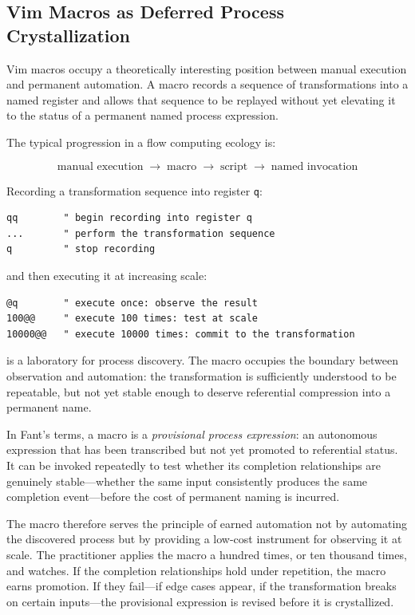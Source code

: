\documentclass[12pt, a4paper]{article}
\begin{document}
\subsection{Vim Macros as Deferred Process Crystallization}

Vim macros occupy a theoretically interesting position between
manual execution and permanent automation. A macro records a
sequence of transformations into a named register and allows that
sequence to be replayed without yet elevating it to the status of
a permanent named process expression.

The typical progression in a flow computing ecology is:

\[
\text{manual execution}
\;\to\;
\text{macro}
\;\to\;
\text{script}
\;\to\;
\text{named invocation}
\]

Recording a transformation sequence into register \texttt{q}:

\begin{lstlisting}
qq        " begin recording into register q
...       " perform the transformation sequence
q         " stop recording
\end{lstlisting}

and then executing it at increasing scale:

\begin{lstlisting}
@q        " execute once: observe the result
100@@     " execute 100 times: test at scale
10000@@   " execute 10000 times: commit to the transformation
\end{lstlisting}

is a laboratory for process discovery. The macro occupies the
boundary between observation and automation: the transformation
is sufficiently understood to be repeatable, but not yet stable
enough to deserve referential compression into a permanent name.

In Fant's terms, a macro is a \emph{provisional process
expression}: an autonomous expression that has been transcribed
but not yet promoted to referential status. It can be invoked
repeatedly to test whether its completion relationships are
genuinely stable---whether the same input consistently produces
the same completion event---before the cost of permanent naming
is incurred.

The macro therefore serves the principle of earned automation
not by automating the discovered process but by providing a
low-cost instrument for observing it at scale. The practitioner
applies the macro a hundred times, or ten thousand times, and
watches. If the completion relationships hold under repetition,
the macro earns promotion. If they fail---if edge cases appear,
if the transformation breaks on certain inputs---the provisional
expression is revised before it is crystallized.
\end{document}
